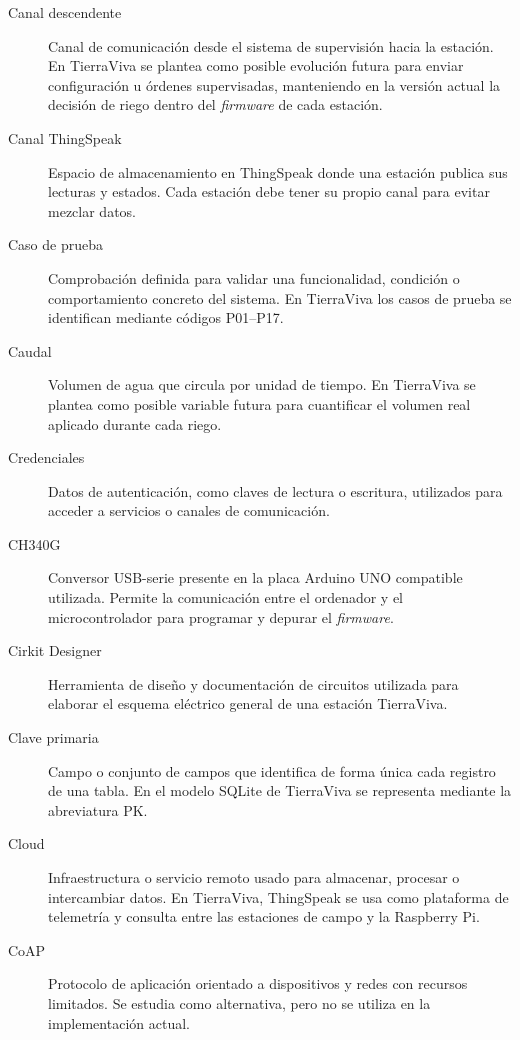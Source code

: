 \begin{description}
    \item[Canal descendente]
    Canal de comunicación desde el sistema de supervisión hacia la estación. En TierraViva se plantea como posible evolución futura para enviar configuración u órdenes supervisadas, manteniendo en la versión actual la decisión de riego dentro del \textit{firmware} de cada estación.

    \item[Canal ThingSpeak]
    Espacio de almacenamiento en ThingSpeak donde una estación publica sus lecturas y estados. Cada estación debe tener su propio canal para evitar mezclar datos.

    \item[Caso de prueba]
    Comprobación definida para validar una funcionalidad, condición o comportamiento concreto del sistema. En TierraViva los casos de prueba se identifican mediante códigos P01--P17.

    \item[Caudal]
    Volumen de agua que circula por unidad de tiempo. En TierraViva se plantea como posible variable futura para cuantificar el volumen real aplicado durante cada riego.

    \item[Credenciales]
    Datos de autenticación, como claves de lectura o escritura, utilizados para acceder a servicios o canales de comunicación.

    \item[CH340G]
    Conversor USB-serie presente en la placa Arduino UNO compatible utilizada. Permite la comunicación entre el ordenador y el microcontrolador para programar y depurar el \textit{firmware}.

    \item[Cirkit Designer]
    Herramienta de diseño y documentación de circuitos utilizada para elaborar el esquema eléctrico general de una estación TierraViva.

    \item[Clave primaria]
    Campo o conjunto de campos que identifica de forma única cada registro de una tabla. En el modelo SQLite de TierraViva se representa mediante la abreviatura PK.

    \item[Cloud]
    Infraestructura o servicio remoto usado para almacenar, procesar o intercambiar datos. En TierraViva, ThingSpeak se usa como plataforma de telemetría y consulta entre las estaciones de campo y la Raspberry Pi.

    \item[CoAP]
    Protocolo de aplicación orientado a dispositivos y redes con recursos limitados. Se estudia como alternativa, pero no se utiliza en la implementación actual.


\end{description}
